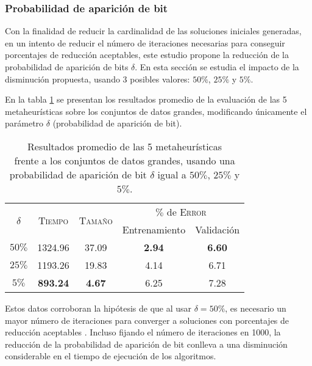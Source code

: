\subsubsection{Probabilidad de aparición de bit}

Con la finalidad de reducir la cardinalidad de las soluciones iniciales generadas, en un intento de reducir el número de iteraciones necesarias para conseguir porcentajes de reducción aceptables, este estudio propone la reducción de la probabilidad de aparición de bits $\delta$. En esta sección se estudia el impacto de la disminución propuesta, usando 3 posibles valores: $50\%$, $25\%$ y $5\%$.

En la tabla \ref{table-unif} se presentan los resultados promedio de la evaluación de las 5 metaheurísticas sobre los conjuntos de datos grandes, modificando únicamente el parámetro $\delta$ (probabilidad de aparición de bit).

\begin{table}[h!]
\centering
\begin{tabular}{c c c c c}
\hline
\multirow{2}{*}{$\delta$}
	& \multirow{2}{*}{\textsc{Tiempo}}
	& \multirow{2}{*}{\textsc{Tamaño}}
	& \multicolumn{2}{c}{$\%$ de \textsc{Error}} \\\cline{4-5}
 & & & \scriptsize{Entrenamiento} & \scriptsize{Validación} \\
\hline
\hline
$50\%$ & 1324.96 & 37.09 & \textbf{2.94} & \textbf{6.60} \\
$25\%$ & 1193.26 & 19.83 & 4.14 & 6.71 \\
$5\%$  & \textbf{893.24} & \textbf{4.67} & 6.25 & 7.28 \\
\hline
\end{tabular}
\caption[Resultados modificando la probabilidad de aparición de bit]{Resultados promedio de las 5 metaheurísticas\\frente a los conjuntos de datos grandes, usando una\\probabilidad de aparición de bit $\delta$ igual a $50\%$, $25\%$ y $5\%$.}
\label{table-unif}
\end{table}

Estos datos corroboran la hipótesis de que al usar $\delta = 50\%$, es necesario un mayor número de iteraciones para converger a soluciones con porcentajes de reducción aceptables \cite{cano2003using}. Incluso fijando el número de iteraciones en 1000, la reducción de la probabilidad de aparición de bit conlleva a una disminución considerable en el tiempo de ejecución de los algoritmos.

